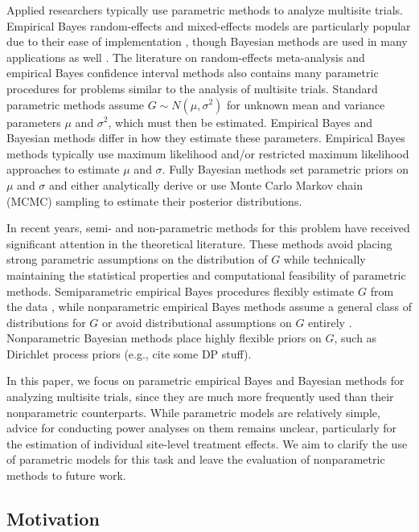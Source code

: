 \documentclass[]{article}
\begin{document}
Applied researchers typically use parametric methods to analyze multisite trials.
Empirical Bayes random-effects and mixed-effects models are particularly popular due to their ease of implementation \citep{bloom2017using}, though Bayesian methods are used in many applications as well \citep{rubin1981estimation}.
The literature on random-effects meta-analysis \citep{higgins2009re} and empirical Bayes confidence interval methods \citep{morris1983parametric, he1992parametric, gene2009empirical} also contains many parametric procedures for problems similar to the analysis of multisite trials.
Standard parametric methods assume $G \sim N(\mu, \sigma^2)$ for unknown mean and variance parameters $\mu$ and $\sigma^2$, which must then be estimated.
Empirical Bayes and Bayesian methods differ in how they estimate these parameters.
Empirical Bayes methods typically use maximum likelihood and/or restricted maximum likelihood approaches to estimate $\mu$ and $\sigma$.
Fully Bayesian methods set parametric priors on $\mu$ and $\sigma$ and either analytically derive or use Monte Carlo Markov chain (MCMC) sampling to estimate their posterior distributions.

In recent years, semi- and non-parametric methods for this problem have received significant attention in the theoretical literature.
These methods avoid placing strong parametric assumptions on the distribution of $G$ while technically maintaining the statistical properties and computational feasibility of parametric methods.
Semiparametric empirical Bayes procedures flexibly estimate $G$ from the data \citep{laird1987empirical, yu2018adaptive}, while nonparametric empirical Bayes methods assume a general class of distributions for $G$ \citep{ignatiadis2022confidence} or avoid distributional assumptions on $G$ entirely \citep{armstrong2020robust}.
Nonparametric Bayesian methods place highly flexible priors on $G$, such as Dirichlet process priors (e.g., cite some DP stuff).

In this paper, we focus on parametric empirical Bayes and Bayesian methods for analyzing multisite trials, since they are much more frequently used than their nonparametric counterparts.
While parametric models are relatively simple, advice for conducting power analyses on them remains unclear, particularly for the estimation of individual site-level treatment effects.
We aim to clarify the use of parametric models for this task and leave the evaluation of nonparametric methods to future work.

\subsection{Motivation}
\end{document}
